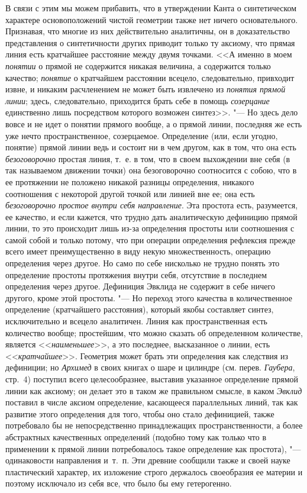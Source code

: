 В связи с этим мы можем прибавить, что в утверждении Канта о синтетическом
характере основоположений чистой геометрии также нет ничего основательного.
Признавая, что многие из них действительно аналитичны, он в доказательство
представления о синтетичности других приводит только ту аксиому, что прямая
линия есть кратчайшее расстояние между двумя точками. <<А именно в моем
{\em понятии} о прямой не содержится никакая величина,
а содержится только качество; {\em понятие} о
кратчайшем расстоянии всецело, следовательно, привходит извне, и никаким
расчленением не может быть извлечено из {\em понятия
прямой линии}; здесь, следовательно, приходится брать себе в помощь
{\em созерцание} единственно лишь посредством которого
возможен синтез>>. "--- Но здесь дело вовсе и не идет о понятии прямого вообще,
а о прямой линии, последняя же есть уже нечто пространственное,
созерцаемое. Определение (или, если угодно, понятие) прямой линии ведь и
состоит ни в чем другом, как в том, что она есть
{\em безоговорочно} простая линия, т.~е. в том, что в
своем выхождении вне себя (в так называемом движении точки) она
безоговорочно соотносится с собою, что в ее протяжении не положено никакой
разницы определения, никакого соотношения с некоторой другой точкой или
линией вне ее; она есть {\em безоговорочно простое
внутри себя направление}. Эта простота есть, разумеется, ее качество, и
если кажется, что трудно дать аналитическую дефиницию прямой линии, то это
происходит лишь из-за определения простоты или соотношения с самой собой и
только потому, что при операции определения рефлексия прежде всего имеет
преимущественно в виду некую множественность, операцию определения через
другое. Но само по себе нисколько не трудно понять это определение простоты
протяжения внутри себя, отсутствие в последнем определения через другое.
Дефиниция Эвклида не содержит в себе ничего другого, кроме этой простоты. "---
Но переход этого качества в количественное определение (кратчайшего
расстояния), который якобы составляет синтез, исключительно и всецело
аналитичен. Линия как пространственная есть количество вообще; простейшим,
что можно сказать об определенном количестве, является
<<{\em наименьшее}>>, а это последнее, высказанное о
линии, есть <<{\em кратчайшее}>>. Геометрия может брать
эти определения как следствия из дефиниции; но
{\em Архимед} в своих книгах о шаре и цилиндре (см.
перев. {\em Гаубера}, стр.~4) поступил всего
целесообразнее, выставив указанное определение прямой линии как аксиому; он
делает это в таком же правильном смысле, в каком
{\em Эвклид} поставил в числе аксиом определение,
касающееся параллельных линий, так как развитие этого определения для того,
чтобы оно стало дефиницией, также потребовало бы не непосредственно
принадлежащих пространственности, а более абстрактных качественных
определений (подобно тому как только что в применении к прямой линии
потребовалось такое определение как простота), "--- одинаковости направления
и~т.~п. Эти древние сообщили также и своей науке пластический характер, их
изложение строго держалось своеобразия ее материи и поэтому исключало из
себя все, что было бы ему гетерогенно.

